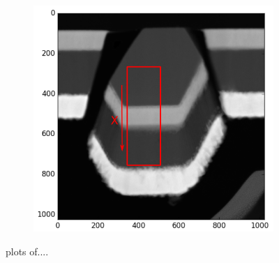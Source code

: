 \begin{figure}
\begin{subfigure}{.5\textwidth}
			\caption{}
			\label{fig:zeta_area1_all}
	\end{subfigure}%
	\begin{subfigure}{.5\textwidth}
		\centering
		\newlength\imageheight
		\includegraphics[width=.68\linewidth]{fig/q/1_overview3}
		\caption{}
		\label{fig:zeta_area1_overview}
	\end{subfigure}
	\caption{plots of....}
	\label{fig:zeta_area1}
\end{figure}

